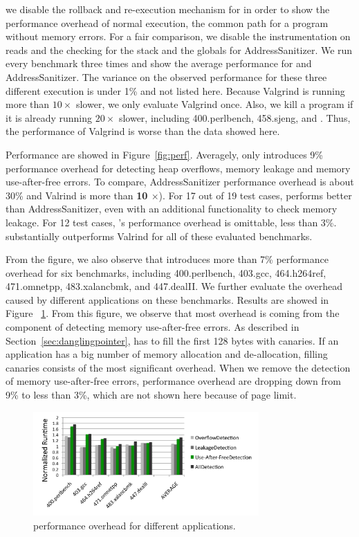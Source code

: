 we disable the rollback and re-execution mechanism for \doubletake{} in order to show the performance overhead of normal execution, the common path for a program without memory errors. For a fair comparison, we disable the instrumentation on reads and the checking for the stack and the globals for AddressSanitizer. We run every benchmark three times and show the average performance for \doubletake{} and AddressSanitizer. The variance on the observed performance for these three different execution is under 1\% and not listed here.   
Because Valgrind is running more than $10\times$ slower, we only evaluate Valgrind once. Also, we kill a program if it is already running $20\times$ slower, including 400.perlbench, 458.sjeng, and . Thus, the performance of Valgrind is worse than the data showed here. 

Performance are showed in Figure~\ref{fig:perf}. Averagely, \doubletake{} only introduces 9\% performance overhead for detecting heap overflows, memory leakage and memory use-after-free errors. To compare, AddressSanitizer performance overhead is about 30\% and Valrind is more than \textbf{10 $\times$}). For 17 out of 19 test cases, \doubletake{} performs better than AddressSanitizer, even with an additional functionality to check memory leakage. For 12 test cases, \doubletake{}'s performance overhead is omittable, less than 3\%. \doubletake{} substantially outperforms Valrind for all of these evaluated benchmarks. 

From the figure, we also observe that \doubletake{} introduces more than 7\% performance overhead for six benchmarks, including 400.perlbench, 403.gcc, 464.h264ref, 471.omnetpp, 483.xalancbmk, and 447.dealII. We further evaluate the overhead caused by different applications on these benchmarks. Results are showed in Figure ~\ref{fig:perfdetails}. From this figure, we observe that most overhead is coming from the component of detecting memory use-after-free errors. As described in Section~\ref{sec:danglingpointer}, \doubletake{} has to fill the first 128 bytes with canaries. If an application has a big number of memory allocation and de-allocation, filling canaries consists of the most significant overhead. When we remove the detection of memory use-after-free errors, performance overhead are dropping down from 9\% to less than 3\%, which are not shown here because of page limit. 

\begin{figure}
\begin{center}
\includegraphics[width=3.4in]{figure/perfdetails}
\end{center}
\caption{
\doubletake{} performance overhead for different applications.
\label{fig:perfdetails}}
\end{figure}

